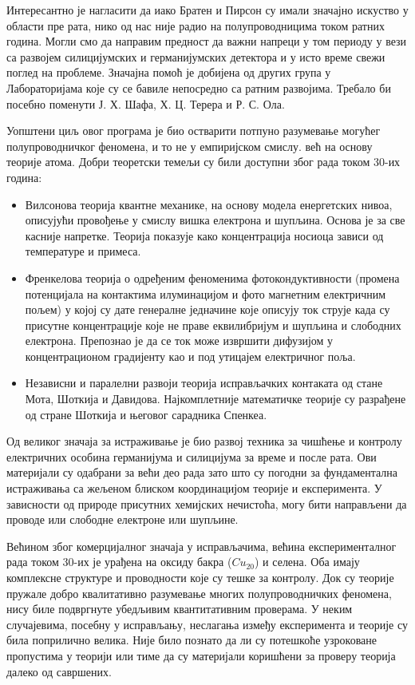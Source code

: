 \documentclass{article}
\begin{document}
Интересантно је нагласити да иако Братен и Пирсон су имали значајно искуство у области пре рата, нико од нас није радио на полупроводницима током ратних година. Могли смо да направим предност да важни напреци у том периоду у вези са развојем силицијумских и германијумских детектора и у исто време свежи поглед на проблеме. Значајна помоћ је добијена од других група у Лабораторијама које су се бавиле непосредно  са ратним развојима. Требало би посебно поменути Ј. Х. Шафа, Х. Ц. Терера и Р. С. Ола. 


Уопштени циљ овог програма је био остварити потпуно разумевање могућег полупроводничког феномена, и то не у емпиријском смислу. већ на основу теорије атома. Добри теоретски темељи су били доступни због рада током 30-их година:

\begin{itemize}
	\item Вилсонова теорија квантне механике, на основу модела енергетских нивоа, описујући провођење у смислу вишка електрона и шупљина. Основа је за све касније напретке. Теорија показује како концентрација носиоца зависи од температуре и примеса.
	\item Френкелова теорија о одређеним феноменима фотокондуктивности (промена потенцијала на контактима илуминацијом и фото магнетним електричним пољем) у којој су дате генералне једначине које описују ток струје када су присутне концентрације које не праве еквилибријум и шупљина и слободних електрона. Препознао је да се ток може извршити дифузијом у концентрационом градијенту као и под утицајем електричног поља.
	\item Независни и паралелни развоји теорија исправљачких контаката од стане Мота, Шоткија и Давидова. Најкомплетније математичке теорије су разрађене од стране Шоткија и његовог сарадника Спенкеа. 
\end{itemize}


Од великог значаја за истраживање је био развој техника за чишћење и контролу електричних особина германијума и силицијума за време и после рата. Ови материјали су одабрани за већи део рада зато што су погодни за фундаментална истраживања са жељеном блиском координацијом теорије и експеримента. У зависности од природе присутних хемијских нечистоћа, могу бити направљени да проводе или слободне електроне или шупљине.

Већином због комерцијалног значаја у исправљачима, већина експерименталног рада током 30-их је урађена на оксиду бакра ($Cu_20$) и селена. Оба имају комплексне структуре и проводности које су тешке за контролу. Док су теорије пружале добро квалитативно разумевање многих полупроводничких феномена, нису биле подвргнуте убедљивим квантитативним проверама. У неким случајевима, посебну у исправљању, неслагања између експеримента и теорије су била поприлично велика. Није било познато да ли су потешкоће узроковане пропустима у теорији или тиме да су материјали коришћени за проверу теорија далеко од савршених.
\end{document}
